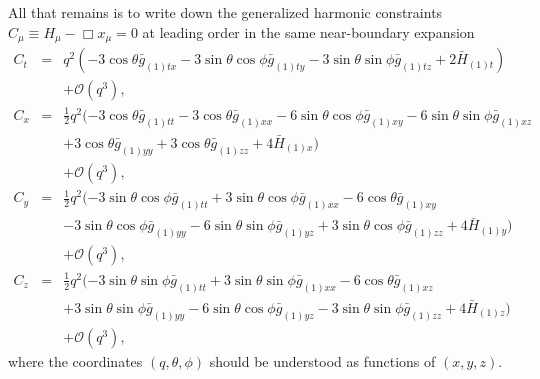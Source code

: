\documentclass[a4paper,11pt]{article}
\numberwithin{equation}{section}
\begin{document}
All that remains is to write down the generalized harmonic constraints $C_\mu \equiv H_\mu-\Box x_\mu = 0$ at leading order in the same near-boundary expansion
\begin{eqnarray}
\label{eqn:ct}
C_t&=&q^2 (-3 \cos \theta  \bar{g}_{(1)tx}-3 \sin \theta  \cos \phi  \bar{g}_{(1)ty}-3 \sin \theta  \sin \phi \bar{g}_{(1)tz}+2
   \bar{H}_{(1) t}) \nonumber \\
   &&+\mathcal{O}(q^3),\\
%
\label{eqn:cx}
C_x&=&\frac{1}{2} q^2 (-3 \cos \theta  \bar{g}_{(1)tt}-3 \cos \theta  \bar{g}_{(1)xx}-6 \sin \theta  \cos \phi  \bar{g}_{(1)xy}-6 \sin
   \theta  \sin \phi  \bar{g}_{(1)xz} \nonumber \\
  &&+3 \cos \theta  \bar{g}_{(1)yy}+3
   \cos \theta  \bar{g}_{(1)zz}+4 \bar{H}_{(1) x}) \nonumber \\
   &&+\mathcal{O}(q^3),\\
%
\label{eqn:cy}
C_y&=&\frac{1}{2} q^2 (-3 \sin \theta  \cos \phi  \bar{g}_{(1)tt}+3 \sin
   \theta  \cos \phi  \bar{g}_{(1)xx}-6 \cos \theta  \bar{g}_{(1)xy} \nonumber \\
   &&-3
   \sin \theta  \cos \phi  \bar{g}_{(1) yy}-6 \sin \theta  \sin \phi
   \bar{g}_{(1)yz}+3 \sin \theta  \cos \phi  \bar{g}_{(1)zz}+4
   \bar{H}_{(1) y}) \nonumber \\
   &&+\mathcal{O}(q^3),\\
%
\label{eqn:cz}
C_z&=&\frac{1}{2} q^2 (-3 \sin \theta \sin \phi  \bar{g}_{(1)tt}+3 \sin
   \theta \sin \phi \bar{g}_{(1)xx}-6 \cos \theta  \bar{g}_{(1)xz} \nonumber \\
   &&+3
   \sin \theta \sin \phi  \bar{g}_{(1)yy}-6 \sin \theta  \cos \phi    \bar{g}_{(1)yz}-3 \sin \theta  \sin \phi  \bar{g}_{(1)zz}+4
   \bar{H}_{(1)z}) \nonumber \\
   &&+\mathcal{O}(q^3),
\end{eqnarray}
where the coordinates $(q,\theta,\phi)$ should be understood as functions of $(x,y,z)$.
\end{document}
